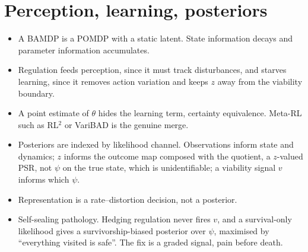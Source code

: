 \documentclass[10pt]{article}
\begin{document}
\section{Perception, learning, posteriors}
\begin{itemize}
  \item A BAMDP is a POMDP with a static latent.
    State information decays and parameter information accumulates.
  \item Regulation feeds perception, since it must track disturbances, and starves learning, since it removes action variation and keeps $z$ away from the viability boundary.
  \item A point estimate of $\theta$ hides the learning term, certainty equivalence.
    Meta-RL such as RL$^2$ or VariBAD is the genuine merge.
  \item Posteriors are indexed by likelihood channel.
    Observations inform state and dynamics; $z$ informs the outcome map composed with the quotient, a $z$-valued PSR, not $\psi$ on the true state, which is unidentifiable; a viability signal $v$ informs which $\psi$.
  \item Representation is a rate--distortion decision, not a posterior.
  \item Self-sealing pathology.
    Hedging regulation never fires $v$, and a survival-only likelihood gives a survivorship-biased posterior over $\psi$, maximised by ``everything visited is safe''.
    The fix is a graded signal, pain before death.
\end{itemize}
\end{document}
